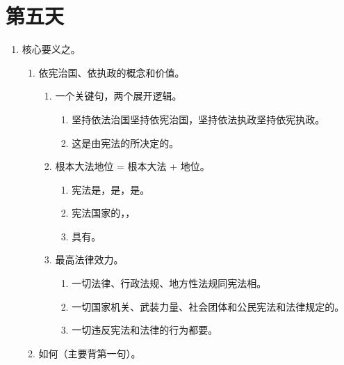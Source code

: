 \section{第五天}
\begin{enumerate}
  \item 核心要义之。
        \begin{enumerate}
          \item 依宪治国、依执政的概念和价值。
                \begin{enumerate}
                  \item 一个关键句，两个展开逻辑。
                        \begin{enumerate}
                          \item 坚持依法治国坚持依宪治国，坚持依法执政坚持依宪执政。
                          \item 这是由宪法的所决定的。
                        \end{enumerate}
                  \item 根本大法地位 = 根本大法 + 地位。
                        \begin{enumerate}
                          \item 宪法是，是，是。
                          \item 宪法国家的，，
                          \item 具有。
                        \end{enumerate}
                  \item 最高法律效力。
                        \begin{enumerate}
                          \item 一切法律、行政法规、地方性法规同宪法相。
                          \item 一切国家机关、武装力量、社会团体和公民宪法和法律规定的。
                          \item 一切违反宪法和法律的行为都要。
                        \end{enumerate}
                \end{enumerate}
          \item 如何（主要背第一句）。
                \begin{enumerate}

\end{enumerate}
\end{enumerate}
\end{enumerate}
